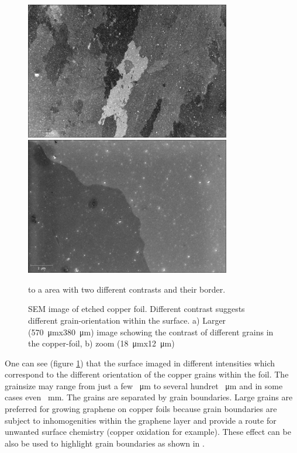\begin{figure}[h]
  \begin{center}
   \includegraphics[height=6cm]{./images/Domenik_16031715.jpg}
   \includegraphics[height=6cm]{./images/Domenik_16031717.jpg}
  \end{center}
 \caption{SEM image of etched copper foil. Different contrast suggests different grain-orientation within the surface. a) Larger (\SI{570}{\micro \meter}x\SI{380}{\micro \meter}) image schowing the contrast of different grains in the copper-foil, b) zoom (\SI{18}{\micro \meter}x\SI{12}{\micro \meter})} to a area with two different contrasts and their border.
 \label{SEM-gb}
\end{figure}

One can see (figure \ref{SEM-gb}) that the surface imaged in different intensities which correspond to the different orientation of the copper grains within the foil\cite{wu_effects_2015}. The grainsize may range from just a few \SI{}{\micro \meter} to several hundret \SI{}{\micro \meter} and in some cases even \SI{}{\milli \meter}. The grains are separated by grain boundaries. Large grains are preferred for growing graphene on copper foils because grain boundaries are subject to inhomogenities within the graphene layer and provide a route for unwanted surface chemistry (copper oxidation for example). These effect can be also be used to highlight grain boundaries as shown in \cite{wu_effects_2015}.

